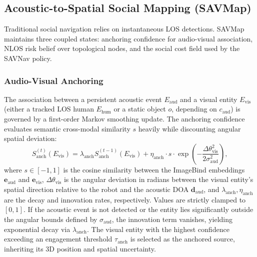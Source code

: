 \subsection{Acoustic-to-Spatial Social Mapping (SAVMap)}
\label{subsec:savmap}

Traditional social navigation relies on instantaneous LOS detections. SAVMap maintains three coupled states: anchoring confidence for audio-visual association, NLOS risk belief over topological nodes, and the social cost field used by the SAVNav policy.

\subsubsection{Audio-Visual Anchoring}
The association between a persistent acoustic event $E_{\mathrm{aud}}$ and a visual entity $E_{\mathrm{vis}}$ (either a tracked LOS human $E_{\mathrm{hum}}$ or a static object $o$, depending on $c_{\mathrm{aud}}$) is governed by a first-order Markov smoothing update. The anchoring confidence evaluates semantic cross-modal similarity $s$ heavily while discounting angular spatial deviation:
\begin{equation}
    S_{\mathrm{anch}}^{(t)}(E_{\mathrm{vis}}) = \lambda_{\mathrm{anch}} S_{\mathrm{anch}}^{(t-1)}(E_{\mathrm{vis}}) + \eta_{\mathrm{anch}} \cdot s \cdot \exp\left(-\frac{\Delta\theta_\mathrm{vis}^2}{2\sigma_{\mathrm{aud}}^2}\right),
    \label{eq:anch_update}
\end{equation}
where $s \in [-1, 1]$ is the cosine similarity between the ImageBind embeddings $\mathbf{e}_{\mathrm{aud}}$ and $\mathbf{e}_{\mathrm{vis}}$, $\Delta\theta_\mathrm{vis}$ is the angular deviation in radians between the visual entity's spatial direction relative to the robot and the acoustic DOA $\mathbf{d}_{\mathrm{aud}}$, and $\lambda_{\mathrm{anch}}, \eta_{\mathrm{anch}}$ are the decay and innovation rates, respectively. Values are strictly clamped to $[0,1]$. If the acoustic event is not detected or the entity lies significantly outside the angular bounds defined by $\sigma_{\mathrm{aud}}$, the innovation term vanishes, yielding exponential decay via $\lambda_{\mathrm{anch}}$. The visual entity with the highest confidence exceeding an engagement threshold $\tau_{\mathrm{anch}}$ is selected as the anchored source, inheriting its 3D position and spatial uncertainty.

